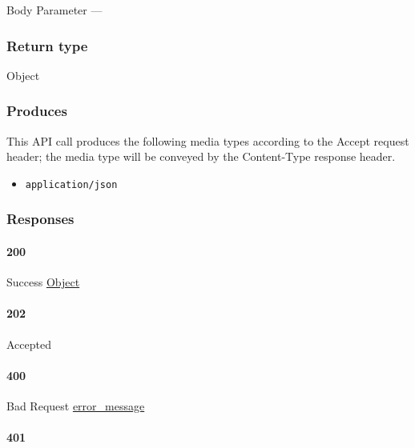 {Body Parameter} ---

\hypertarget{return-type-74}{%
\subsubsection{Return type}\label{return-type-74}}

Object

\hypertarget{produces-92}{%
\subsubsection{Produces}\label{produces-92}}

This API call produces the following media types according to the
{Accept} request header; the media type will be conveyed by the
{Content-Type} response header.

\begin{itemize}
\tightlist
\item
  \texttt{application/json}
\end{itemize}

\hypertarget{responses-94}{%
\subsubsection{Responses}\label{responses-94}}

\hypertarget{section-307}{%
\paragraph{200}\label{section-307}}

Success \protect\hyperlink{Object}{Object}

\hypertarget{section-308}{%
\paragraph{202}\label{section-308}}

Accepted \protect\hyperlink{}{}

\hypertarget{section-309}{%
\paragraph{400}\label{section-309}}

Bad Request \protect\hyperlink{error_message}{error\_message}

\hypertarget{section-310}{%
\paragraph{401}\label{section-310}}

